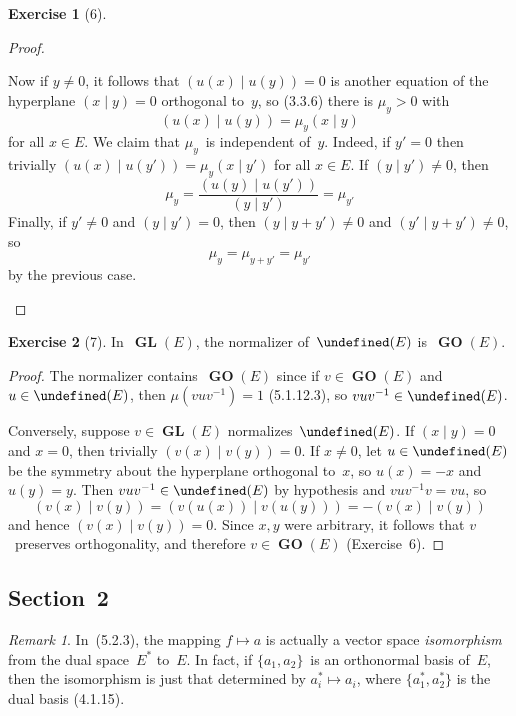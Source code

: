 \documentclass[letterpaper,12pt]{article}
\let\O\undefined %
\DeclareMathOperator{\GL}{\mathbf{GL}}
\DeclareMathOperator{\GO}{\mathbf{GO}}
\DeclareMathOperator{\O}{\mathbf{O}}
\newcommand{\inv}[1]{#1^{-1}}
\newcommand{\dual}[1]{#1^*}
\newcommand{\innerprod}[2]{({#1}\;|\;{#2})}
\theoremstyle{definition}
\newtheorem*{exer}{Exercise}
\theoremstyle{remark}
\newtheorem*{rmk}{Remark}
\begin{document}
\begin{exer}[6]
\begin{proof}
\begin{itemize}[itemsep=0pt]
Now if \(y\ne 0\), it follows that \(\innerprod{u(x)}{u(y)}=0\) is another equation of the hyperplane \(\innerprod{x}{y}=0\) orthogonal to~\(y\), so (3.3.6) there is \(\mu_y>0\) with
\[\innerprod{u(x)}{u(y)}=\mu_y\innerprod{x}{y}\]
for all \(x\in E\). We claim that \(\mu_y\)~is independent of~\(y\). Indeed, if \(y'=0\) then trivially \(\innerprod{u(x)}{u(y')}=\mu_y\innerprod{x}{y'}\) for all \(x\in E\). If \(\innerprod{y}{y'}\ne 0\), then
\[\mu_{y}=\frac{\innerprod{u(y)}{u(y')}}{\innerprod{y}{y'}}=\mu_{y'}\]
Finally, if \(y'\ne 0\) and \(\innerprod{y}{y'}=0\), then \(\innerprod{y}{y+y'}\ne 0\) and \(\innerprod{y'}{y+y'}\ne 0\), so
\[\mu_y=\mu_{y+y'}=\mu_{y'}\]
by the previous case.\qedhere
\end{itemize}
\end{proof}
\end{exer}

\begin{exer}[7]
In~\(\GL(E)\), the normalizer of~\(\O(E)\) is~\(\GO(E)\).
\end{exer}
\begin{proof}
The normalizer contains~\(\GO(E)\) since if \(v\in\GO(E)\) and \(u\in\O(E)\), then \(\mu(vu\inv{v})=1\) (5.1.12.3), so \(vu\inv{v}\in\O(E)\).

Conversely, suppose \(v\in\GL(E)\) normalizes~\(\O(E)\). If \(\innerprod{x}{y}=0\) and \(x=0\), then trivially \(\innerprod{v(x)}{v(y)}=0\). If \(x\ne 0\), let \(u\in\O(E)\) be the symmetry about the hyperplane orthogonal to~\(x\), so \(u(x)=-x\) and \(u(y)=y\). Then \(vu\inv{v}\in\O(E)\) by hypothesis and \(vu\inv{v}v=vu\), so
\[\innerprod{v(x)}{v(y)}=\innerprod{v(u(x))}{v(u(y))}=-\innerprod{v(x)}{v(y)}\]
and hence \(\innerprod{v(x)}{v(y)}=0\). Since \(x,y\) were arbitrary, it follows that \(v\)~preserves orthogonality, and therefore \(v\in\GO(E)\) (Exercise~6).
\end{proof}

\subsection*{Section~2}
\begin{rmk}
In~(5.2.3), the mapping \(f\mapsto a\) is actually a vector space \emph{isomorphism} from the dual space~\(\dual{E}\) to~\(E\). In fact, if \(\{a_1,a_2\}\)~is an orthonormal basis of~\(E\), then the isomorphism is just that determined by \(\dual{a_i}\mapsto a_i\), where \(\{\dual{a_1},\dual{a_2}\}\) is the dual basis (4.1.15).
\end{rmk}
\end{document}
